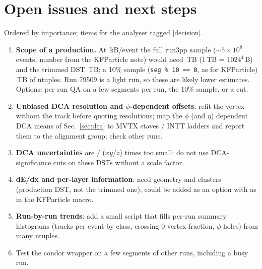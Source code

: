 \section{Open issues and next steps}
\label{sec:open}

Ordered by importance; items for the analyser tagged [decision].
\begin{enumerate}\itemsep2pt
\item[{[decision]}] \textbf{Scope of a production.} At \sizeNtkB\,kB/event the full run3pp sample
  ($\sim5\times10^8$ events, number from the KFParticle note) would need \projNtFullTB\,TB (1\,TB = $1024^4$\,B) and the trimmed DST \projTrimFullTB\,TB; a 10\%
  sample (\texttt{seg \% 10 == 0}, as for KFParticle) \projNtTenPctTB\,TB of ntuples. Run 79509 is a
  light run, so these are likely lower estimates. Options: per-run QA on a few
  segments per run, the 10\% sample, or a  cut.
\item \textbf{Unbiased DCA resolution and $\phi$-dependent offsets}: refit the vertex without the track
  before quoting resolutions; map the $\phi$ (and $\eta$) dependent DCA means of Sec.~\ref{sec:dca} to
  MVTX staves / INTT ladders and report them to the alignment group; check other runs.
\item \textbf{DCA uncertainties} are \sPullXyA{}/\sPullZA{} ($xy$/$z$) times too small: do not use
  DCA-significance cuts on these DSTs without a scale factor.
\item \textbf{dE/dx and per-layer information}: need geometry and clusters (production DST, not
  the trimmed one); could be added as an option with  as in the KFParticle macro.
\item \textbf{Run-by-run trends}: add a small script that fills per-run summary histograms
  (tracks per event by class, crossing-0 vertex fraction, $\phi$ holes) from many ntuples.
\item Test the condor wrapper on a few segments of other runs, including a busy run.
\end{enumerate}
